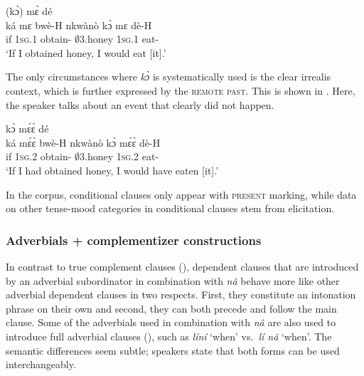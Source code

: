 \ea\label{ka8}
  \textsubscript{{\COND}} (kɔ̀) mɛ̀ dé \\
      {\db}ká mɛ bwè-H nkwànò {\db}kɔ̀ mɛ dè-H \\
       {\db}if 1\textsc{sg}.{\PST}1 obtain-{\R} $\emptyset$3.honey {\db}{\IRR} 1\textsc{sg}.{\PST}1 eat-{\PST} \\
 \trans `If I obtained honey, I would eat [it].'
\z

The only circumstances where {\itshape kɔ̀} is systematically used is the clear irrealis context, which is further expressed by the \textsc{remote past}. This is shown in . Here, the speaker talks about an event that clearly did not happen.


\ea\label{ka9}
  \textsubscript{{\COND}} kɔ̀ mɛ́ɛ̀ dé \\
       {\db}ká mɛ́ɛ̀ bwè-H nkwànò kɔ̀ mɛ́ɛ̀ dè-H \\
       {\db}if 1\textsc{sg}.{\PST}2 obtain-{\R} $\emptyset$3.honey {\IRR} 1\textsc{sg}.{\PST}2 eat-{\PST} \\
 \trans `If I had obtained honey, I would have eaten [it].'
\z

In the corpus, conditional clauses only appear with \textsc{present} marking, while data on other tense-mood categories in conditional clauses stem from elicitation. 










\subsubsection{Adverbials + complementizer constructions}
\label{sec:AComp}

In contrast to true complement clauses (), dependent clauses that are introduced by an adverbial subordinator in combination with {\itshape nâ} behave more like other adverbial dependent clauses in two respects. First, they constitute an intonation phrase on their own and second, they can both precede and follow the main clause. Some of the adverbials used in combination with {\itshape nâ} are also used to introduce full adverbial clauses (), such as {\itshape líní} `when' vs.\ {\itshape lí nâ} `when'. The semantic differences seem subtle; speakers state that both forms can be used interchangeably.


